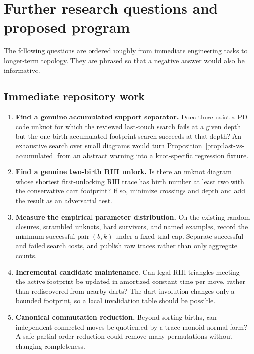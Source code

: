 \section{Further research questions and proposed program}
\label{sec:questions}

The following questions are ordered roughly from immediate engineering tasks to
longer-term topology.  They are phrased so that a negative answer would also be
informative.

\subsection{Immediate repository work}

\begin{enumerate}[label=\textbf{Q\arabic*.}]
\item \textbf{Find a genuine accumulated-support separator.}
      Does there exist a PD-code unknot for which the reviewed last-touch search
      fails at a given depth but the one-birth accumulated-footprint search
      succeeds at that depth?  An exhaustive search over small diagrams would
      turn Proposition~\ref{prop:last-vs-accumulated} from an abstract warning
      into a knot-specific regression fixture.

\item \textbf{Find a genuine two-birth RIII unlock.}
      Is there an unknot diagram whose shortest first-unlocking RIII trace has
      birth number at least two with the conservative dart footprint?  If so,
      minimize crossings and depth and add the result as an adversarial test.

\item \textbf{Measure the empirical parameter distribution.}
      On the existing random closures, scrambled unknots, hard survivors, and
      named examples, record the minimum successful pair $(b,k)$ under a fixed
      trial cap.  Separate successful and failed search costs, and publish raw
      traces rather than only aggregate counts.

\item \textbf{Incremental candidate maintenance.}
      Can legal RIII triangles meeting the active footprint be updated in
      amortized constant time per move, rather than rediscovered from nearby
      darts?  The dart involution changes only a bounded footprint, so a local
      invalidation table should be possible.

\item \textbf{Canonical commutation reduction.}
      Beyond sorting births, can independent connected moves be quotiented by a
      trace-monoid normal form?  A safe partial-order reduction could remove many
      permutations without changing completeness.
\end{enumerate}

